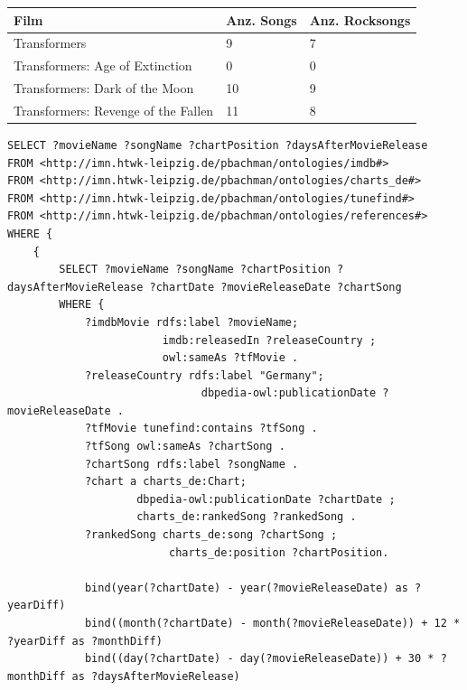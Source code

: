 \documentclass[parskip]{scrartcl}
\begin{document}
\label{tab:resultLastFm}
\begin{tabular}{p{}|C{0.18\textwidth}|C{0.25\textwidth}}
    \textbf{Film} & \textbf{Anz. Songs} & \textbf{Anz. Rocksongs} \\ \hline
    Transformers & 9 & 7 \\
    Transformers: Age of Extinction & 0 & 0 \\
    Transformers: Dark of the Moon & 10 & 9 \\
    Transformers: Revenge of the Fallen & 11 & 8\\
\end{tabular}

\pagebreak
\begin{lstlisting}[caption={SPARQL-Anfrage zum Beantworten der Recherchefragestellung}, label={lst:questionSparql}]
SELECT ?movieName ?songName ?chartPosition ?daysAfterMovieRelease
FROM <http://imn.htwk-leipzig.de/pbachman/ontologies/imdb#>
FROM <http://imn.htwk-leipzig.de/pbachman/ontologies/charts_de#>
FROM <http://imn.htwk-leipzig.de/pbachman/ontologies/tunefind#>
FROM <http://imn.htwk-leipzig.de/pbachman/ontologies/references#>
WHERE { 
    {
        SELECT ?movieName ?songName ?chartPosition ?daysAfterMovieRelease ?chartDate ?movieReleaseDate ?chartSong
        WHERE {
            ?imdbMovie rdfs:label ?movieName;
                        imdb:releasedIn ?releaseCountry ;
                        owl:sameAs ?tfMovie .
            ?releaseCountry rdfs:label "Germany";
                              dbpedia-owl:publicationDate ?movieReleaseDate .
            ?tfMovie tunefind:contains ?tfSong .
            ?tfSong owl:sameAs ?chartSong .
            ?chartSong rdfs:label ?songName .
            ?chart a charts_de:Chart;
                    dbpedia-owl:publicationDate ?chartDate ;
                    charts_de:rankedSong ?rankedSong .
            ?rankedSong charts_de:song ?chartSong ;
                         charts_de:position ?chartPosition.
            
            bind(year(?chartDate) - year(?movieReleaseDate) as ?yearDiff)
            bind((month(?chartDate) - month(?movieReleaseDate)) + 12 * ?yearDiff as ?monthDiff)
            bind((day(?chartDate) - day(?movieReleaseDate)) + 30 * ?monthDiff as ?daysAfterMovieRelease)
            

\end{lstlisting}
\end{document}
